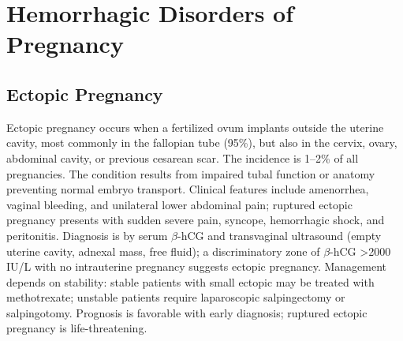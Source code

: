 \section{Hemorrhagic Disorders of Pregnancy}








\label{sec:Hemorrhagic Disorders of Pregnancy}

\subsection{Ectopic Pregnancy}
\label{sec:Ectopic Pregnancy}
Ectopic pregnancy occurs when a fertilized ovum implants outside the uterine cavity, most commonly in the fallopian tube (95\%), but also in the cervix, ovary, abdominal cavity, or previous cesarean scar. The incidence is 1--2\% of all pregnancies. The condition results from impaired tubal function or anatomy preventing normal embryo transport. Clinical features include amenorrhea, vaginal bleeding, and unilateral lower abdominal pain; ruptured ectopic pregnancy presents with sudden severe pain, syncope, hemorrhagic shock, and peritonitis. Diagnosis is by serum $\beta$-hCG and transvaginal ultrasound (empty uterine cavity, adnexal mass, free fluid); a discriminatory zone of $\beta$-hCG >2000 IU/L with no intrauterine pregnancy suggests ectopic pregnancy. Management depends on stability: stable patients with small ectopic may be treated with methotrexate; unstable patients require laparoscopic salpingectomy or salpingotomy. Prognosis is favorable with early diagnosis; ruptured ectopic pregnancy is life-threatening.

